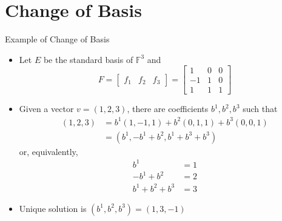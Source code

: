 \documentclass[usenames,dvipsnames,10pt]{beamer}
\newcommand\F{\mathbb{F}}
\begin{document}
\section{Change of Basis}

\begin{frame}
  {Example of Change of Basis}

  \begin{itemize}
  \item Let $E$ be the standard basis of $\F^3$ and
    \[
      F = \begin{bmatrix} f_1 & f_2 & f_3 \end{bmatrix}
      = \left[ \begin{array}{c|c|c} 1 & 0 & 0 \\ -1 & 1 & 0 \\ 1 & 1 & 1 \end{array}\right]
    \]
  \item Given a vector $v = (1,2,3)$, there are coefficients $b^1, b^2, b^3$ such that
    \begin{align*}
      (1,2,3) &= b^1(1,-1,1) + b^2(0,1,1) + b^3(0,0,1)\\
              &= (b^1, -b^1+b^2, b^1+b^3+b^3)
    \end{align*}
    or, equivalently,
    \begin{align*}
      b^1 &= 1\\
      -b^1 + b^2 &= 2\\
      b^1 + b^2 + b^3 &= 3
    \end{align*}
  \item Unique solution is $(b^1,b^2,b^3) = (1, 3, -1)$
  \end{itemize}
\end{frame}
\end{document}
